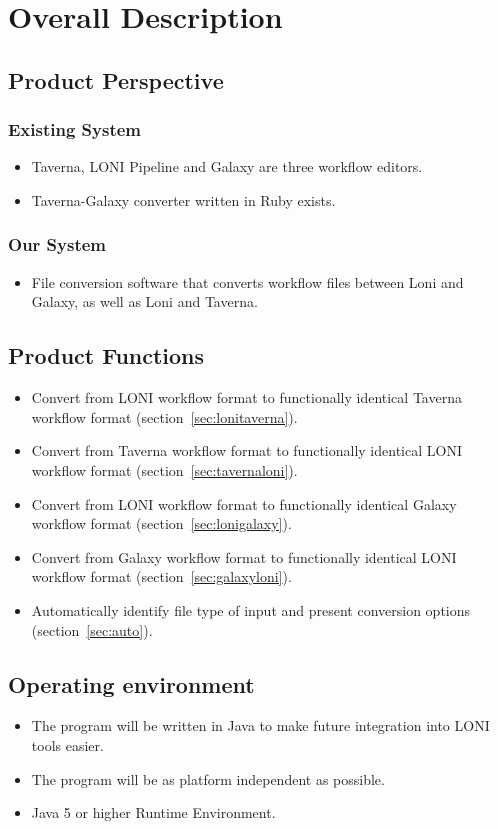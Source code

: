 \documentclass[12pt]{article}
\begin{document}
\section{Overall Description}
\subsection{Product Perspective}
\subsubsection{Existing System}
\begin{itemize}
\item Taverna, LONI Pipeline and Galaxy are three workflow editors.
\item Taverna-Galaxy converter written in Ruby exists.
\end{itemize}
\subsubsection{Our System}
\begin{itemize}
\item File conversion software that converts workflow files between Loni and Galaxy, as well as Loni and Taverna.
\end{itemize}

\subsection{Product Functions}
\begin{itemize}
\item Convert from LONI workflow format to functionally identical Taverna workflow format (section~\ref{sec:lonitaverna}).
\item Convert from Taverna workflow format to functionally identical LONI workflow format (section~\ref{sec:tavernaloni}).
\item Convert from LONI workflow format to functionally identical Galaxy workflow format (section~\ref{sec:lonigalaxy}).
\item Convert from Galaxy workflow format to functionally identical LONI workflow format (section~\ref{sec:galaxyloni}).
\item Automatically identify file type of input and present conversion options (section~\ref{sec:auto}).
\end{itemize}

\subsection{Operating environment}
\begin{itemize}
\item The program will be written in Java to make future integration into LONI tools easier.
\item The program will be as platform independent as possible.
\item Java 5 or higher Runtime Environment.
\end{itemize}
\end{document}
